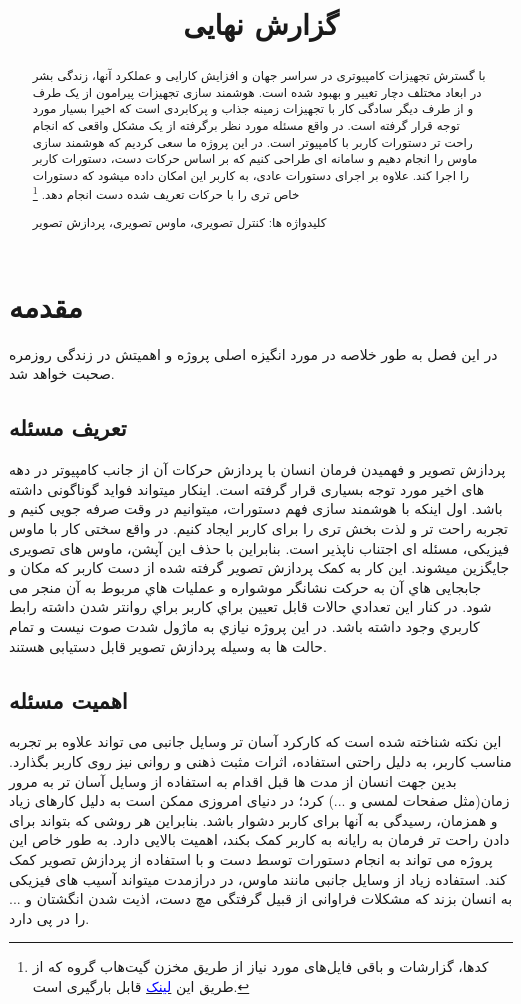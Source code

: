 \documentclass{article}
\title{گزارش نهایی}
\begin{document}
\heading
\header
\allowdisplaybreaks
\begin{abstract}
با گسترش تجهیزات کامپیوتری در سراسر جهان و افزایش کارایی و عملکرد آنها، زندگی بشر در ابعاد مختلف دچار تغییر و بهبود شده است. هوشمند سازی تجهیزات پیرامون از یک طرف و از طرف دیگر سادگی کار با تجهیزات زمینه جذاب و پرکابردی است که اخیرا بسیار مورد توجه قرار گرفته است. در واقع مسئله مورد نظر برگرفته از یک مشکل واقعی که انجام راحت تر دستورات کاربر با کامپیوتر است. در این پروژه ما سعی کردیم که هوشمند سازی ماوس را انجام دهیم و سامانه ای طراحی کنیم که بر اساس حرکات دست، دستورات کاربر را اجرا کند. علاوه بر اجرای دستورات عادی، به کاربر این امکان داده میشود که دستورات خاص تری را با حرکات تعریف شده دست انجام دهد.
\footnote{کد‌ها، گزارشات و باقی‌ فایل‌های مورد نیاز از طریق مخزن گیت‌هاب گروه که از طریق این 
\href{https://github.com/Sharif-University-ESRLab/project-team-3}{\textcolor{blue}{لینک}}
قابل بارگیری‌ است.
}

کلیدواژه ها: کنترل تصویری، ماوس تصویری، پردازش تصویر
\end{abstract}
\pagebreak
\tableofcontents
\pagebreak

\section{مقدمه}
در این فصل به طور خلاصه در مورد انگیزه اصلی پروژه و اهمیتش در زندگی روزمره صحبت خواهد شد.

\subsection{تعریف مسئله}
پردازش تصویر و فهمیدن فرمان انسان با پردازش حرکات آن از جانب کامپیوتر در دهه های اخیر مورد توجه بسیاری قرار گرفته است. اینکار میتواند فواید گوناگونی داشته باشد. اول اینکه با هوشمند سازی فهم دستورات، میتوانیم در وقت صرفه جویی کنیم و تجربه راحت تر و لذت بخش تری را برای کاربر ایجاد کنیم. در واقع سختی کار با ماوس فیزیکی، مسئله ای اجتناب ناپذیر است. بنابراین با حذف این آپشن، ماوس های تصویری جایگزین میشوند. این کار به کمک پردازش تصویر گرفته شده از دست کاربر که مکان و جابجایی هاي آن به حرکت نشانگر موشواره و عملیات هاي مربوط به آن منجر می شود. در کنار این تعدادي حالات قابل تعیین براي کاربر براي روانتر شدن داشته رابط کاربري وجود داشته باشد. در این پروژه نیازي به ماژول شدت صوت نیست و تمام حالت ها به وسیله پردازش تصویر قابل دستیابی هستند. 

\subsection{اهمیت مسئله}
این نکته شناخته شده است که کارکرد آسان تر وسایل جانبی می تواند علاوه بر تجربه مناسب کاربر، به دلیل راحتی استفاده، اثرات مثبت ذهنی و روانی نیز روی کاربر بگذارد. بدین جهت انسان از مدت ها قبل اقدام به استفاده از وسایل آسان تر به مرور زمان(مثل صفحات لمسی و ...) کرد؛ در دنیای امروزی ممکن است به دلیل کارهای زیاد و همزمان، رسیدگی به آنها برای کاربر دشوار باشد. بنابراین هر روشی که بتواند برای دادن راحت تر فرمان به رایانه به کاربر کمک بکند، اهمیت بالایی دارد. به طور خاص این پروژه می تواند به انجام دستورات توسط دست و با استفاده از پردازش تصویر کمک کند. استفاده زیاد از وسایل جانبی مانند ماوس، در درازمدت میتواند آسیب های فیزیکی به انسان بزند که مشکلات فراوانی از قبیل گرفتگی مچ دست، اذیت شدن انگشتان و ... را در پی دارد.
\end{document}

